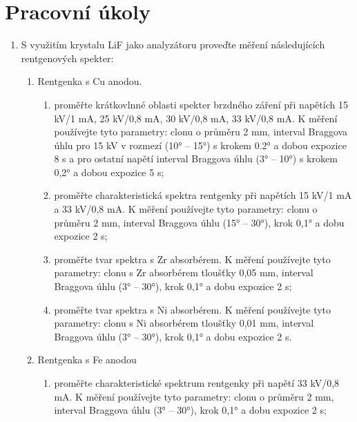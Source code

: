 
\section{Pracovní úkoly}

\begin{enumerate}
\item S využitím krystalu LiF jako analyzátoru proveďte měření následujících rentgenových spekter:

\begin{enumerate}
    \item Rentgenka s Cu anodou.

    \begin{enumerate}
        \item proměřte krátkovlnné oblasti spekter brzdného záření při napětích 15 kV/1 mA, 25 kV/0,8 mA, 30 kV/0,8 mA, 33 kV/0,8 mA. K měření používejte tyto parametry: clonu o průměru 2 mm, interval Braggova úhlu pro 15 kV v rozmezí (10° – 15°) s krokem 0.2° a dobou expozice 8 s a pro ostatní napětí interval Braggova úhlu (3° – 10°) s krokem 0,2° a dobou expozice 5 s;

        \item proměřte charakteristická spektra rentgenky při napětích 15 kV/1 mA a 33 kV/0,8 mA. K měření používejte tyto parametry: clonu o průměru 2 mm, interval Braggova úhlu (15° – 30°), krok 0,1° a dobu expozice 2 s;

        \item proměřte tvar spektra s Zr absorbérem. K měření používejte tyto parametry: clonu s Zr absorbérem tloušťky 0,05 mm, interval Braggova úhlu (3° – 30°), krok 0,1° a dobu expozice 2 s;

        \item proměřte tvar spektra s Ni absorbérem. K měření používejte tyto parametry: clonu s Ni absorbérem tloušťky 0,01 mm, interval Braggova úhlu (3° – 30°), krok 0,1° a dobu expozice 2 s.
    \end{enumerate}

\item Rentgenka s Fe anodou

    \begin{enumerate}
        \item proměřte charakteristické spektrum rentgenky při napětí 33 kV/0,8 mA. K měření používejte tyto parametry: clonu o průměru 2 mm, interval Braggova úhlu (3° – 30°), krok 0,1° a dobu expozice 2 s;


\end{enumerate}
\end{enumerate}
\end{enumerate}
